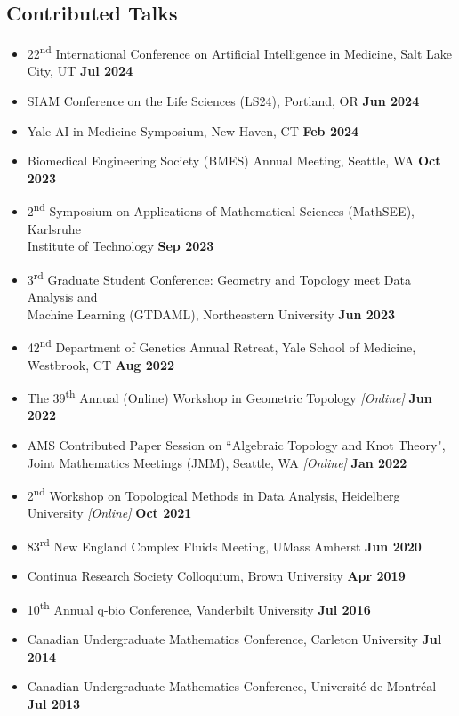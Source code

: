 \documentclass[margin,line]{res}
\begin{document}
\begin{resume}
\section{\sc Contributed Talks}
{\renewcommand\leftmargini{0em}
\begin{itemize}
\setlength\itemsep{0.3em}
\item[] 22\textsuperscript{nd} International Conference on Artificial Intelligence in Medicine, Salt Lake City, UT \hfill {\bf \small Jul 2024}
\item[] SIAM Conference on the Life Sciences (LS24), Portland, OR \hfill {\bf \small Jun 2024}
\item[] Yale AI in Medicine Symposium, New Haven, CT \hfill {\bf \small Feb 2024}
\item[] Biomedical Engineering Society (BMES) Annual Meeting, Seattle, WA \hfill {\bf \small Oct 2023}
\item[] 2\textsuperscript{nd} Symposium on Applications of Mathematical Sciences (MathSEE), Karlsruhe \\ Institute of Technology \hfill {\bf \small Sep 2023}
\item[] 3\textsuperscript{rd} Graduate Student Conference: Geometry and Topology meet Data Analysis and \\Machine Learning (GTDAML), Northeastern University \hfill {\bf \small Jun 2023}
\item[] 42\textsuperscript{nd} Department of Genetics Annual Retreat, Yale School of Medicine, Westbrook, CT \hfill {\bf \small Aug 2022}
\item[] The 39\textsuperscript{th} Annual (Online) Workshop in Geometric Topology \textit{[Online]} \hfill {\bf \small Jun 2022}
\item[] AMS Contributed Paper Session on ``Algebraic Topology and Knot Theory", \\Joint Mathematics Meetings (JMM), Seattle, WA \textit{[Online]} \hfill {\bf \small Jan 2022}
\item[] 2\textsuperscript{nd} Workshop on Topological Methods in Data Analysis, Heidelberg University \textit{[Online]} \hfill {\bf \small Oct 2021}
\item[] 83\textsuperscript{rd} New England Complex Fluids Meeting, UMass Amherst \hfill {\bf \small Jun 2020}
\item[] Continua Research Society Colloquium, Brown University \hfill {\bf \small Apr 2019}
\item[] 10\textsuperscript{th} Annual q-bio Conference, Vanderbilt University \hfill {\bf \small Jul 2016}
\item[] Canadian Undergraduate Mathematics Conference, Carleton University \hfill {\bf \small Jul 2014}
\item[] Canadian Undergraduate Mathematics Conference, Universit\'e de Montr\'eal \hfill {\bf \small Jul 2013}
\end{itemize}
}


\end{resume}
\end{document}
